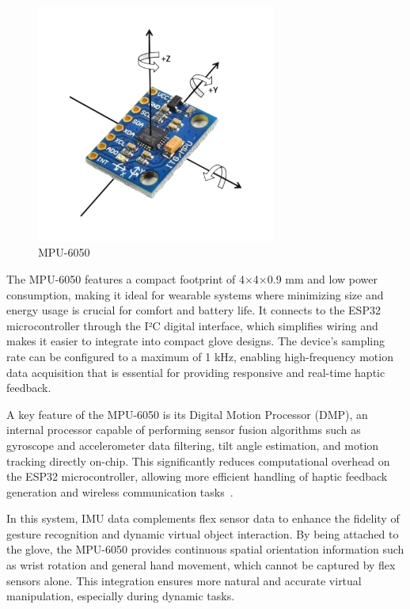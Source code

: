 \begin{figure}[H]\centering
	\includegraphics[width=0.7\textwidth]{Pictures/mpu.png}%
	\caption{MPU-6050~\cite{mpu}}\label{fig:mpu}%
\end{figure}

The MPU-6050 features a compact footprint of 4×4×0.9 mm and low power consumption, making it ideal for wearable systems where minimizing size and energy usage is crucial for comfort and battery life. It connects to the ESP32 microcontroller through the I²C digital interface, which simplifies wiring and makes it easier to integrate into compact glove designs. The device's sampling rate can be configured to a maximum of 1 kHz, enabling high-frequency motion data acquisition that is essential for providing responsive and real-time haptic feedback.

A key feature of the MPU-6050 is its Digital Motion Processor (DMP), an internal processor capable of performing sensor fusion algorithms such as gyroscope and accelerometer data filtering, tilt angle estimation, and motion tracking directly on-chip. This significantly reduces computational overhead on the ESP32 microcontroller, allowing more efficient handling of haptic feedback generation and wireless communication tasks~\cite{mpu6050datasheet}.

In this system, IMU data complements flex sensor data to enhance the fidelity of gesture recognition and dynamic virtual object interaction. By being attached to the glove, the MPU-6050 provides continuous spatial orientation information such as wrist rotation and general hand movement, which cannot be captured by flex sensors alone. This integration ensures more natural and accurate virtual manipulation, especially during dynamic tasks. 

